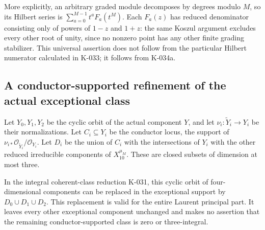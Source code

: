 More explicitly, an arbitrary graded module decomposes by degrees
modulo $M$, so its Hilbert series is
$\sum_{a=0}^{M-1}t^aF_a(t^M)$.  Each $F_a(z)$ has reduced
denominator consisting only of powers of $1-z$ and $1+z$:
the same Koszul argument excludes every other root of unity,
since no nonzero point has any other finite grading stabilizer.
This universal assertion does not follow from the particular
Hilbert numerator calculated in K-033; it follows from K-034a.

\subsection*{A conductor-supported refinement of the actual exceptional class}

Let $Y_0,Y_1,Y_2$ be the cyclic orbit of the actual component $Y$,
and let $\nu_i:\widetilde Y_i\to Y_i$ be their normalizations.
Let $C_i\subseteq Y_i$ be the conductor locus, the support of
$\nu_{i*}\mathcal O_{\widetilde Y_i}/\mathcal O_{Y_i}$.
Let $D_i$ be the union of $C_i$ with the intersections of $Y_i$
with the other reduced irreducible components of $X_{10}^{\mu_M}$.
These are closed subsets of dimension at most three.

\begin{proposition}[K-034b]
In the integral coherent-class reduction K-031, this cyclic orbit
of four-dimensional components can be replaced in the exceptional
support by $D_0\cup D_1\cup D_2$.  This replacement is valid for
the entire Laurent principal part.  It leaves every other
exceptional component unchanged and makes no assertion that the
remaining conductor-supported class is zero or three-integral.
\end{proposition}

